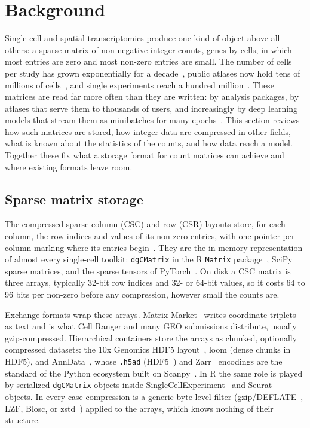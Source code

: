 \section{Background}
\label{sec:background}

Single-cell and spatial transcriptomics produce one kind of object above all others: a sparse matrix of non-negative
integer counts, genes by cells, in which most entries are zero and most non-zero entries are small. The number of
cells per study has grown exponentially for a decade~\cite{svensson2018exponential}, public atlases now hold tens of
millions of cells~\cite{czi2025cellxgene,tabulasapiens2022,sikkema2023integrated}, and single experiments reach a
hundred million~\cite{zhang2025tahoe}. These matrices are read far more often than they are written: by analysis
packages, by atlases that serve them to thousands of users, and increasingly by deep learning models that stream
them as minibatches for many epochs~\cite{lopez2018deep,theodoris2023transfer,cui2024scgpt}. This section reviews how
such matrices are stored, how integer data are compressed in other fields, what is known about the statistics of the
counts, and how data reach a model. Together these fix what a storage format for count matrices can achieve and
where existing formats leave room.

\subsection{Sparse matrix storage}

The compressed sparse column (CSC) and row (CSR) layouts store, for each column, the row indices and values of its
non-zero entries, with one pointer per column marking where its entries begin~\cite{saad2003iterative,davis2006direct}.
They are the in-memory representation of almost every single-cell toolkit: \texttt{dgCMatrix} in the R
\texttt{Matrix} package~\cite{bates2024matrix}, SciPy sparse matrices, and the sparse tensors of
PyTorch~\cite{paszke2019pytorch}. On disk a CSC matrix is three arrays, typically 32-bit row indices and 32- or
64-bit values, so it costs 64 to 96 bits per non-zero before any compression, however small the counts are.

Exchange formats wrap these arrays. Matrix Market~\cite{boisvert1997matrix} writes coordinate triplets as text and is
what Cell Ranger and many GEO submissions distribute, usually gzip-compressed. Hierarchical containers store the
arrays as chunked, optionally compressed datasets: the 10x Genomics HDF5 layout~\cite{zheng2017massively}, loom
(dense chunks in HDF5), and AnnData~\cite{virshup2024anndata}, whose \texttt{.h5ad} (HDF5~\cite{hdf5}) and Zarr~\cite{zarr}
encodings are the standard of the Python ecosystem built on Scanpy~\cite{wolf2018scanpy}. In R the same role is
played by serialized \texttt{dgCMatrix} objects inside SingleCellExperiment~\cite{amezquita2020orchestrating} and
Seurat~\cite{hao2024dictionary} objects. In every case compression is a generic byte-level filter (gzip/DEFLATE~\cite{deutsch1996deflate},
LZF, Blosc, or zstd~\cite{collet2021zstd}) applied to the arrays, which knows nothing of their structure.

